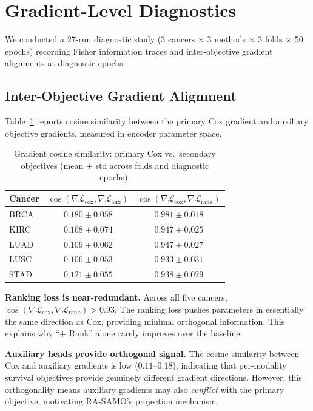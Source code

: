 \documentclass[10pt,twocolumn]{article}
\begin{document}
\section{Gradient-Level Diagnostics}
\label{sec:diagnostics}

We conducted a 27-run diagnostic study (3 cancers $\times$ 3
methods $\times$ 3 folds $\times$ 50 epochs) recording Fisher
information traces and inter-objective gradient alignments at
diagnostic epochs.

\subsection{Inter-Objective Gradient Alignment}

Table~\ref{tab:alignment} reports cosine similarity between the
primary Cox gradient and auxiliary objective gradients, measured in
encoder parameter space.

\begin{table}[t]
\centering
\caption{Gradient cosine similarity: primary Cox vs.\ secondary
objectives (mean $\pm$ std across folds and diagnostic epochs).}
\label{tab:alignment}
\begin{tabular}{lcc}
\toprule
Cancer & $\cos(\nabla\mathcal{L}_{\text{cox}}, \nabla\mathcal{L}_{\text{aux}})$ &
$\cos(\nabla\mathcal{L}_{\text{cox}}, \nabla\mathcal{L}_{\text{rank}})$ \\
\midrule
BRCA & $0.180 \pm 0.058$ & $0.981 \pm 0.018$ \\
KIRC & $0.168 \pm 0.074$ & $0.947 \pm 0.025$ \\
LUAD & $0.109 \pm 0.062$ & $0.947 \pm 0.027$ \\
LUSC & $0.106 \pm 0.053$ & $0.933 \pm 0.031$ \\
STAD & $0.121 \pm 0.055$ & $0.938 \pm 0.029$ \\
\bottomrule
\end{tabular}
\end{table}

\textbf{Ranking loss is near-redundant.} Across all five cancers,
$\cos(\nabla\mathcal{L}_{\text{cox}}, \nabla\mathcal{L}_{\text{rank}})
> 0.93$. The ranking loss pushes parameters in essentially the same
direction as Cox, providing minimal orthogonal information. This
explains why ``+ Rank'' alone rarely improves over the baseline.

\textbf{Auxiliary heads provide orthogonal signal.} The cosine
similarity between Cox and auxiliary gradients is low
($0.11$--$0.18$), indicating that per-modality survival objectives
provide genuinely different gradient directions. However, this
orthogonality means auxiliary gradients may also \textit{conflict}
with the primary objective, motivating RA-SAMO's projection mechanism.
\end{document}
